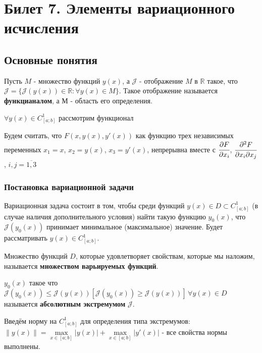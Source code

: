 \documentclass[a4paper, 12pt]{article}
\begin{document}
    \section{Билет 7. Элементы вариационного исчисления}
    \subsection{Основные понятия}
    \begin{definition}
        Пусть $M$ - множество функций $y(x)$, а $\mathcal{J}$ - отображение $M$ в $\mathbb{R}$ такое, что $\mathcal{J} = \{ \mathcal{J}(y(x)) \in \mathbb{R}: \forall y(x) \in M \}$. 
        Такое отображение называется \textbf{функцианалом}, а $М$ - область его определения. 
    \end{definition}

    $\forall y(x) \in C^1_{[a;b]}$ рассмотрим функционал 

    Будем считать, что $F(x, y(x), y'(x))$ как функцию трех независимых переменных $x_1 = x$, $x_2 = y(x)$, $x_3 = y'(x)$, непрерывна вместе с $\cfrac{\partial{F}}{\partial{x_i}}$,  $\cfrac{\partial^2{F}}{\partial{x_i}\partial{x_j}}$, $i,j = \overline{1, 3}$ 
    
    \subsubsection*{Постановка вариационной задачи}

    Вариационная задача состоит в том, чтобы среди функций $y(x) \in D \subset C^1_{[a;b]}$ (в случае наличия дополнительного условия) найти такую функцию $y_0(x)$, что $\mathcal{J}(y_0(x))$ принимает минимальное (максимальное) значение. Будет рассматривать $y(x) \in C^1_{[a;b]}$.

    \begin{definition}
        Множество функций $D$, которые удовлетворяет свойствам, которые мы наложим, называется \textbf{множеством варьируемых функций}.
    \end{definition}

    \begin{definition}
        $y_0(x)$ такое что $\mathcal{J}(y_0(x)) \leq \mathcal{J}(y(x)) [\mathcal{J}(y_0(x)) \geq \mathcal{J}(y(x))] \, \forall y(x) \in D$ называется \textbf{абсолютным экстремумом} $\mathcal{J}$.  
    \end{definition}
    
    Введём норму на $C^1_{[a;b]}$ для определения типа экстремумов: $\| y(x) \| = \max \limits_{x \in [a;b]} |y(x)| + \max \limits_{x \in [a;b]} |y'(x)|$ - все свойства нормы выполнены.
\end{document}
